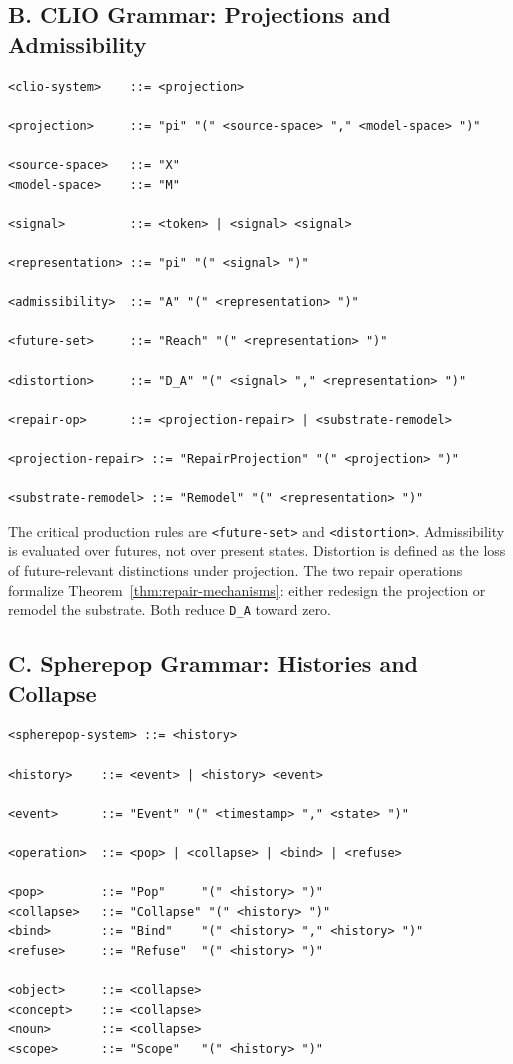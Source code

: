 \documentclass[12pt,a4paper]{article}
\begin{document}
\subsection*{B. CLIO Grammar: Projections and Admissibility}

\begin{verbatim}
<clio-system>    ::= <projection>

<projection>     ::= "pi" "(" <source-space> "," <model-space> ")"

<source-space>   ::= "X"
<model-space>    ::= "M"

<signal>         ::= <token> | <signal> <signal>

<representation> ::= "pi" "(" <signal> ")"

<admissibility>  ::= "A" "(" <representation> ")"

<future-set>     ::= "Reach" "(" <representation> ")"

<distortion>     ::= "D_A" "(" <signal> "," <representation> ")"

<repair-op>      ::= <projection-repair> | <substrate-remodel>

<projection-repair> ::= "RepairProjection" "(" <projection> ")"

<substrate-remodel> ::= "Remodel" "(" <representation> ")"
\end{verbatim}

\noindent The critical production rules are \texttt{<future-set>} and \texttt{<distortion>}. Admissibility is evaluated over futures, not over present states. Distortion is defined as the loss of future-relevant distinctions under projection. The two repair operations formalize Theorem~\ref{thm:repair-mechanisms}: either redesign the projection or remodel the substrate. Both reduce \texttt{D\_A} toward zero.

\subsection*{C. Spherepop Grammar: Histories and Collapse}

\begin{verbatim}
<spherepop-system> ::= <history>

<history>    ::= <event> | <history> <event>

<event>      ::= "Event" "(" <timestamp> "," <state> ")"

<operation>  ::= <pop> | <collapse> | <bind> | <refuse>

<pop>        ::= "Pop"     "(" <history> ")"
<collapse>   ::= "Collapse" "(" <history> ")"
<bind>       ::= "Bind"    "(" <history> "," <history> ")"
<refuse>     ::= "Refuse"  "(" <history> ")"

<object>     ::= <collapse>
<concept>    ::= <collapse>
<noun>       ::= <collapse>
<scope>      ::= "Scope"   "(" <history> ")"
\end{verbatim}
\end{document}
